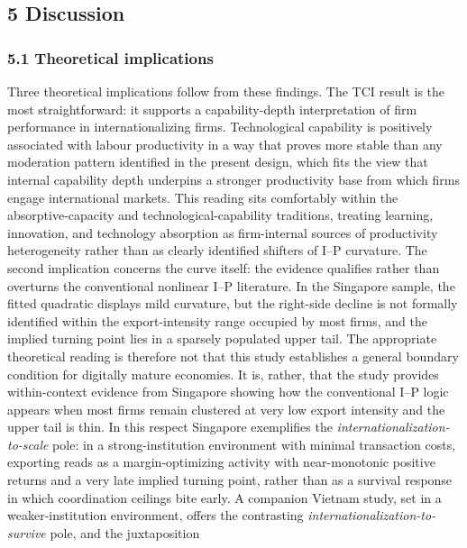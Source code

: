 \documentclass[12pt,a4paper]{article}
\begin{document}
\hypertarget{5-discussion}{%
\subsection{5 Discussion}\label{5-discussion}}

\hypertarget{51-theoretical-implications}{%
\subsubsection{5.1 Theoretical
implications}\label{51-theoretical-implications}}

Three theoretical implications follow from these findings. The TCI
result is the most straightforward: it supports a capability-depth
interpretation of firm performance in internationalizing firms.
Technological capability is positively associated with labour
productivity in a way that proves more stable than any moderation
pattern identified in the present design, which fits the view that
internal capability depth underpins a stronger productivity base from
which firms engage international markets. This reading sits comfortably
within the absorptive-capacity and technological-capability traditions,
treating learning, innovation, and technology absorption as
firm-internal sources of productivity heterogeneity rather than as
clearly identified shifters of I--P curvature. The second implication
concerns the curve itself: the evidence qualifies rather than overturns
the conventional nonlinear I--P literature. In the Singapore sample, the
fitted quadratic displays mild curvature, but the right-side decline is
not formally identified within the export-intensity range occupied by
most firms, and the implied turning point lies in a sparsely populated
upper tail. The appropriate theoretical reading is therefore not that
this study establishes a general boundary condition for digitally mature
economies. It is, rather, that the study provides within-context
evidence from Singapore showing how the conventional I--P logic appears
when most firms remain clustered at very low export intensity and the
upper tail is thin. In this respect Singapore exemplifies the
\emph{internationalization-to-scale} pole: in a strong-institution
environment with minimal transaction costs, exporting reads as a
margin-optimizing activity with near-monotonic positive returns and a
very late implied turning point, rather than as a survival response in
which coordination ceilings bite early. A companion Vietnam study, set
in a weaker-institution environment, offers the contrasting
\emph{internationalization-to-survive} pole, and the juxtaposition
\end{document}
